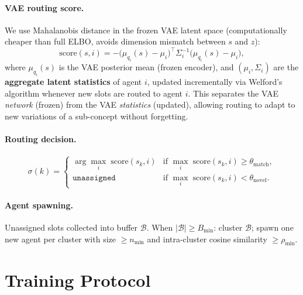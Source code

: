 \documentclass[11pt,a4paper]{article}
\begin{document}
\paragraph{VAE routing score.}
We use Mahalanobis distance in the frozen VAE latent space
(computationally cheaper than full ELBO, avoids dimension mismatch between $s$ and $z$):
\begin{equation}
  \text{score}(s,i) = -\bigl(\mu_{q_i}(s) - \mu_i\bigr)^\top \Sigma_i^{-1}
                       \bigl(\mu_{q_i}(s) - \mu_i\bigr),
\end{equation}
where $\mu_{q_i}(s)$ is the VAE posterior mean (frozen encoder),
and $(\mu_i,\Sigma_i)$ are the \textbf{aggregate latent statistics} of agent $i$,
updated incrementally via Welford's algorithm whenever new slots are routed to agent $i$.
This separates the VAE \emph{network} (frozen) from the VAE \emph{statistics} (updated),
allowing routing to adapt to new variations of a sub-concept without forgetting.

\paragraph{Routing decision.}
\begin{equation}
  \sigma(k) = \begin{cases}
    \arg\max_i\;\mathrm{score}(s_k,i) & \text{if } \max_i\;\mathrm{score}(s_k,i)\geq\theta_{\mathrm{match}}, \\
    \texttt{unassigned} & \text{if } \max_i\;\mathrm{score}(s_k,i)<\theta_{\mathrm{novel}}.
  \end{cases}
\end{equation}

\paragraph{Agent spawning.}
Unassigned slots collected into buffer $\mathcal{B}$.
When $|\mathcal{B}|\geq B_{\min}$: cluster $\mathcal{B}$;
spawn one new agent per cluster with size $\geq n_{\min}$ and
intra-cluster cosine similarity $\geq \rho_{\min}$.

\section{Training Protocol}
\end{document}
